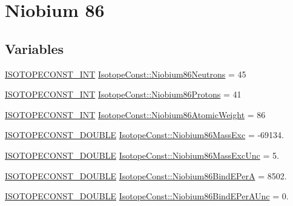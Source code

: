 \hypertarget{group___isotope_const-_niobium-_nb86}{}\section{Niobium 86}
\label{group___isotope_const-_niobium-_nb86}
\subsection*{Variables}
\begin{DoxyCompactItemize}
\item 
\mbox{\hyperlink{group___isotope_const-_macros_ga5f18360b3e99483a35c32d789e62621c}{I\+S\+O\+T\+O\+P\+E\+C\+O\+N\+S\+T\+\_\+\+I\+NT}} \mbox{\hyperlink{group___isotope_const-_niobium-_nb86_gaa5d386f186b53d522eb2ea9e2fbfc0d7}{Isotope\+Const\+::\+Niobium86\+Neutrons}} = 45
\item 
\mbox{\hyperlink{group___isotope_const-_macros_ga5f18360b3e99483a35c32d789e62621c}{I\+S\+O\+T\+O\+P\+E\+C\+O\+N\+S\+T\+\_\+\+I\+NT}} \mbox{\hyperlink{group___isotope_const-_niobium-_nb86_gadd1e81b69c1e67f63e9b5a6478d6ef8c}{Isotope\+Const\+::\+Niobium86\+Protons}} = 41
\item 
\mbox{\hyperlink{group___isotope_const-_macros_ga5f18360b3e99483a35c32d789e62621c}{I\+S\+O\+T\+O\+P\+E\+C\+O\+N\+S\+T\+\_\+\+I\+NT}} \mbox{\hyperlink{group___isotope_const-_niobium-_nb86_ga0cbd916826253c970c2d9925e7c8d216}{Isotope\+Const\+::\+Niobium86\+Atomic\+Weight}} = 86
\item 
\mbox{\hyperlink{group___isotope_const-_macros_ga8f45a7272ce02c0b4c65c44636ed719a}{I\+S\+O\+T\+O\+P\+E\+C\+O\+N\+S\+T\+\_\+\+D\+O\+U\+B\+LE}} \mbox{\hyperlink{group___isotope_const-_niobium-_nb86_gafb9e04c7a1e8702d68d1bb606adb7761}{Isotope\+Const\+::\+Niobium86\+Mass\+Exc}} = -\/69134.
\item 
\mbox{\hyperlink{group___isotope_const-_macros_ga8f45a7272ce02c0b4c65c44636ed719a}{I\+S\+O\+T\+O\+P\+E\+C\+O\+N\+S\+T\+\_\+\+D\+O\+U\+B\+LE}} \mbox{\hyperlink{group___isotope_const-_niobium-_nb86_ga243fc780f6fa700d9e125f5a48f5be81}{Isotope\+Const\+::\+Niobium86\+Mass\+Exc\+Unc}} = 5.
\item 
\mbox{\hyperlink{group___isotope_const-_macros_ga8f45a7272ce02c0b4c65c44636ed719a}{I\+S\+O\+T\+O\+P\+E\+C\+O\+N\+S\+T\+\_\+\+D\+O\+U\+B\+LE}} \mbox{\hyperlink{group___isotope_const-_niobium-_nb86_gaf447f62dc424ae8222c3dfeac6929057}{Isotope\+Const\+::\+Niobium86\+Bind\+E\+PerA}} = 8502.
\item 
\mbox{\hyperlink{group___isotope_const-_macros_ga8f45a7272ce02c0b4c65c44636ed719a}{I\+S\+O\+T\+O\+P\+E\+C\+O\+N\+S\+T\+\_\+\+D\+O\+U\+B\+LE}} \mbox{\hyperlink{group___isotope_const-_niobium-_nb86_ga3e9fcd49b5a315a7982f0695e4ff2a43}{Isotope\+Const\+::\+Niobium86\+Bind\+E\+Per\+A\+Unc}} = 0.

\end{DoxyCompactItemize}
